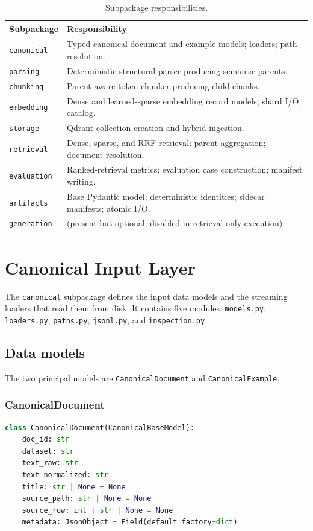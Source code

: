 \documentclass[11pt,a4paper]{article}
\begin{document}
\begin{table}[h]
\centering
\caption{Subpackage responsibilities.}
\label{tab:layers}
\small
\begin{tabular}{p{3.2cm} p{11cm}}
\toprule
\textbf{Subpackage} & \textbf{Responsibility} \\
\midrule
\texttt{canonical} & Typed canonical document and example models; loaders; path resolution. \\
\texttt{parsing} & Deterministic structural parser producing semantic parents. \\
\texttt{chunking} & Parent-aware token chunker producing child chunks. \\
\texttt{embedding} & Dense and learned-sparse embedding record models; shard I/O; catalog. \\
\texttt{storage} & Qdrant collection creation and hybrid ingestion. \\
\texttt{retrieval} & Dense, sparse, and RRF retrieval; parent aggregation; document resolution. \\
\texttt{evaluation} & Ranked-retrieval metrics; evaluation case construction; manifest writing. \\
\texttt{artifacts} & Base Pydantic model; deterministic identities; sidecar manifests; atomic I/O. \\
\texttt{generation} & (present but optional; disabled in retrieval-only execution). \\
\bottomrule
\end{tabular}
\end{table}

\section{Canonical Input Layer}\label{sec:canonical}

The \texttt{canonical} subpackage defines the input data models and
the streaming loaders that read them from disk. It contains five
modules: \texttt{models.py}, \texttt{loaders.py}, \texttt{paths.py},
\texttt{jsonl.py}, and \texttt{inspection.py}.

\subsection{Data models}
The two principal models are \texttt{CanonicalDocument} and
\texttt{CanonicalExample}.

\subsubsection{CanonicalDocument}
\begin{lstlisting}[language=python]
class CanonicalDocument(CanonicalBaseModel):
    doc_id: str
    dataset: str
    text_raw: str
    text_normalized: str
    title: str | None = None
    source_path: str | None = None
    source_row: int | str | None = None
    metadata: JsonObject = Field(default_factory=dict)
\end{lstlisting}
\end{document}
